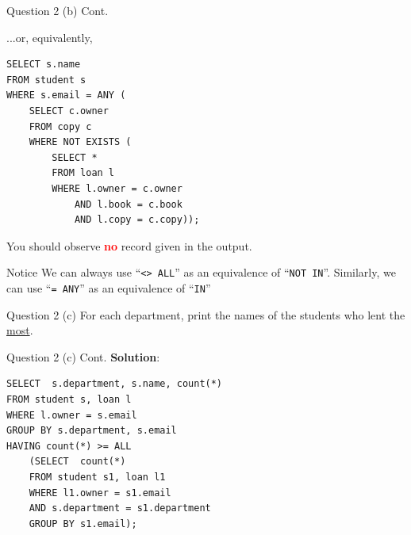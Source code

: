 \begin{frame}[fragile]{Question 2 (b) Cont.}
	
...or, equivalently,
	
\begin{lstlisting}
SELECT s.name 
FROM student s
WHERE s.email = ANY (
	SELECT c.owner
	FROM copy c
	WHERE NOT EXISTS (
		SELECT * 
		FROM loan l
		WHERE l.owner = c.owner
			AND l.book = c.book
			AND l.copy = c.copy));
\end{lstlisting}\vspace{5pt}
	
You should observe \textcolor{red}{\textbf{no}} record given in the output. \\

\begin{block}{Notice}
We can always use ``\texttt{<> ALL}'' as an equivalence of ``\texttt{NOT IN}''. Similarly, we can use ``\texttt{= ANY}'' as an equivalence of ``\texttt{IN}''
\end{block}	
\end{frame}

\begin{frame}[fragile]{Question 2 (c)}
For each department, print the names of the students who lent the \underline{most}.
\end{frame}


\begin{frame}[fragile]{Question 2 (c) Cont.}
\textbf{Solution}:
	
\begin{lstlisting}
SELECT  s.department, s.name, count(*)
FROM student s, loan l
WHERE l.owner = s.email
GROUP BY s.department, s.email
HAVING count(*) >= ALL
	(SELECT  count(*) 
	FROM student s1, loan l1
	WHERE l1.owner = s1.email
	AND s.department = s1.department
	GROUP BY s1.email);
\end{lstlisting}\vspace{5pt}
\end{frame}



